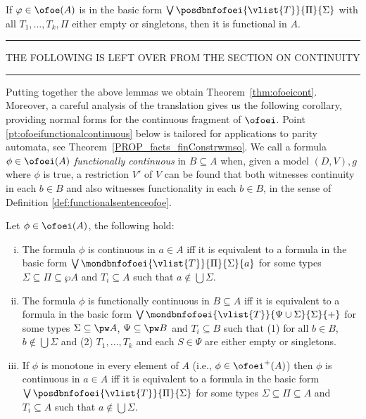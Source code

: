 \begin{proposition}\label{lemma:functionalsentenceofoe} 
If $\varphi \in \ofoe(A)$ is in the basic form $\bigvee 
\posdbnfofoei{\vlist{T}}{\Pi}{\Sigma}$ with all $T_1, \dots, T_k,\Pi$
either 
empty or singletons, then it is functional in $A$.
\end{proposition}

\newpage

\bigskip\hrule\bigskip

THE FOLLOWING IS LEFT OVER FROM THE SECTION ON CONTINUITY

\bigskip\hrule\bigskip

Putting together the above lemmas we obtain
Theorem~\ref{thm:ofoeicont}.
Moreover, a careful analysis of the translation gives us the
following corollary, 
providing normal forms for the continuous fragment of $\ofoei$. 
Point \ref{pt:ofoeifunctionalcontinuous} below is tailored for
applications to
parity automata, see Theorem~\ref{PROP_facts_finConstrwmso}. 
We call a formula $\phi  \in \ofoei(A)$ \emph{functionally
continuous} in
$B \subseteq A$ when, given a model $(D,V),g$ where $\phi$ is true, a 
restriction $V'$ of $V$ can be found that both witnesses continuity
in each
$b \in B$ and also witnesses functionality in each $b \in B$, in the
sense of
Definition \ref{def:functionalsentenceofoe}.

\begin{corollary}\label{cor:ofoeicontinuousnf}
Let $\phi \in \ofoei(A)$, the following hold:
\begin{enumerate}[(i)]
\item 
The formula $\phi$ is continuous in $a \in A$ iff it is equivalent to
a 
formula in the basic form $\bigvee
\mondbnfofoei{\vlist{T}}{\Pi}{\Sigma}{a}$ 
for some types $\Sigma\subseteq\Pi \subseteq \wp A$ and $T_i
\subseteq A$ such 
that $a\notin \bigcup\Sigma$. 	
\label{pt:ofoeifcontinuous}	%
\item 
The formula $\phi$ is functionally continuous in $B \subseteq A$ iff
it is
equivalent to a formula in the basic form $\bigvee 
\mondbnfofoei{\vlist{T}}{\Psi \cup \Sigma}{\Sigma}{+}$ for some types 
$\Sigma\subseteq \pw A$, $\Psi \subseteq \pw B$ and $T_i \subseteq B$
such that
(1) for all $b \in B$, $b\notin \bigcup\Sigma$ and (2)
$T_1,\dots,T_k$ and each 
$S \in \Psi$ are either empty or singletons. 
\label{pt:ofoeifunctionalcontinuous}	%
\item If $\phi$ is monotone in every element of $A$ (i.e., 
$\phi\in{\ofoei}^+(A)$) then $\phi$ is continuous in $a \in A$ iff it
is
equivalent to a formula in the basic form 
$\bigvee \posdbnfofoei{\vlist{T}}{\Pi}{\Sigma}$ for some types
$\Sigma\subseteq\Pi \subseteq A$ and $T_i \subseteq A$ such that 
$a\notin \bigcup\Sigma$. 
\label{pt:ofoeimonotone}
\end{enumerate}
\end{corollary}


